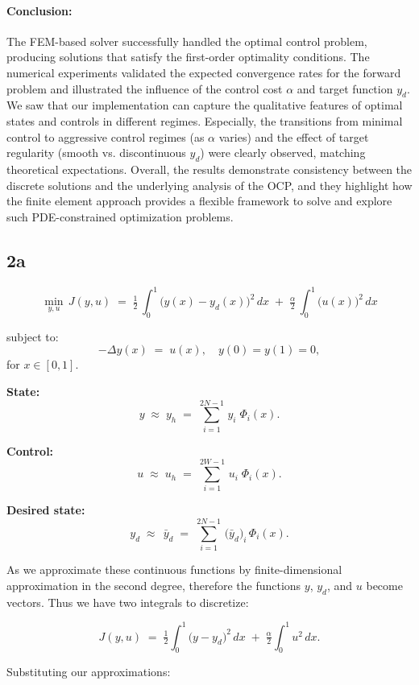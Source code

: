 \paragraph{Conclusion:} 
The FEM-based solver successfully handled the optimal control problem, producing solutions that satisfy the first-order optimality conditions. The numerical experiments validated the expected convergence rates for the forward problem and illustrated the influence of the control cost $\alpha$ and target function $y_d$. We saw that our implementation can capture the qualitative features of optimal states and controls in different regimes. Especially, the transitions from minimal control to aggressive control regimes (as $\alpha$ varies) and the effect of target regularity (smooth vs. discontinuous $y_d$) were clearly observed, matching theoretical expectations. Overall, the results demonstrate consistency between the discrete solutions and the underlying analysis of the OCP, and they highlight how the finite element approach provides a flexible framework to solve and explore such PDE-constrained optimization problems.

\subsection{2a}

\[
	\min_{y,u}\,J(y,u)
	\;=\;
	\tfrac12\,\int_{0}^{1}\bigl(y(x)-y_{d}(x)\bigr)^{2}\,dx
	\;+\;\tfrac{\alpha}{2}\,\int_{0}^{1}\bigl(u(x)\bigr)^{2}\,dx
\]

subject to:
\[
	-\Delta y(x)\;=\;u(x),\quad y(0)=y(1)=0,
\]
for $x\in[0,1]$.

\bigskip

\textbf{State:}
\[
	y \;\approx\; y_{h}
	\;=\;
	\sum_{i=1}^{2N-1}\,y_{i}\;\Phi_{i}(x).
\]

\textbf{Control:}
\[
	u \;\approx\; u_{h}
	\;=\;
	\sum_{i=1}^{2W-1}\,u_{i}\;\Phi_{i}(x).
\]

\textbf{Desired state:}
\[
	y_{d}\;\approx\;\,\bar{y}_{d}
	\;=\;
	\sum_{i=1}^{2N-1}\,\bigl(\bar{y}_{d}\bigr)_{i}\,\Phi_{i}(x).
\]

As we approximate these continuous functions by finite-dimensional approximation in the second degree,
therefore the functions $y$, $y_{d}$, and $u$ become vectors. Thus we have two integrals to discretize:

\[
	J(y,u)
	\;=\;
	\tfrac12\int_{0}^{1}\bigl(y - y_{d}\bigr)^{2}\,dx
	\;+\;
	\tfrac{\alpha}{2}\int_{0}^{1}u^{2}\,dx.
\]

Substituting our approximations:

